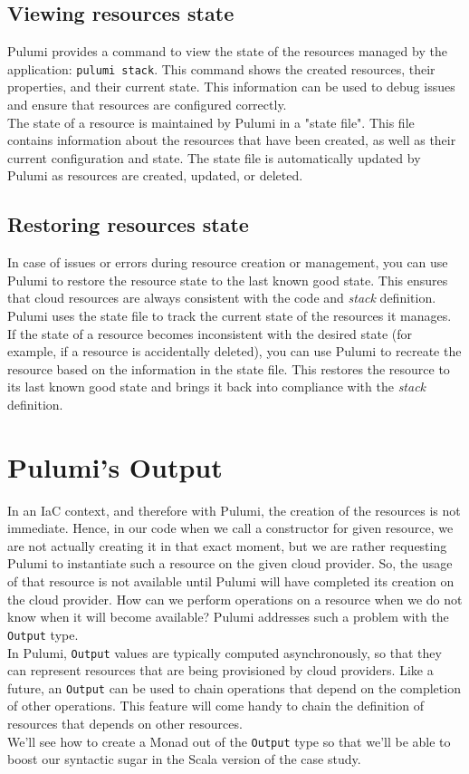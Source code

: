 \subsection{Viewing resources state}
Pulumi provides a command to view the state of the resources managed by the application: \texttt{pulumi stack}.
This command shows the created resources, their properties, and their current state. 
This information can be used to debug issues and ensure that resources are configured correctly.\\
The state of a resource is maintained by Pulumi in a "state file".
This file contains information about the resources that have been created, as well as their current configuration and state.
The state file is automatically updated by Pulumi as resources are created, updated, or deleted.

\subsection{Restoring resources state}
In case of issues or errors during resource creation or management, you can use Pulumi to restore the resource state to the last known good state.
This ensures that cloud resources are always consistent with the code and \textit{stack} definition.\\
Pulumi uses the state file to track the current state of the resources it manages.
If the state of a resource becomes inconsistent with the desired state (for example, if a resource is accidentally deleted), you can use Pulumi to recreate the resource based on the information in the state file.
This restores the resource to its last known good state and brings it back into compliance with the \textit{stack} definition.

\section{Pulumi's Output}
In an IaC context, and therefore with Pulumi, the creation of the resources is not immediate.
Hence, in our code when we call a constructor for given resource, we are not actually creating it in that exact moment, but we are rather requesting Pulumi to instantiate such a resource on the given cloud provider.
So, the usage of that resource is not available until Pulumi will have completed its creation on the cloud provider.
How can we perform operations on a resource when we do not know when it will become available?
Pulumi addresses such a problem with the \texttt{Output} type.\\
In Pulumi, \texttt{Output} values are typically computed asynchronously, so that they can represent resources that are being provisioned by cloud providers.
Like a future, an \texttt{Output} can be used to chain operations that depend on the completion of other operations.
This feature will come handy to chain the definition of resources that depends on other resources.\\
We'll see how to create a Monad out of the \texttt{Output} type so that we'll be able to boost our syntactic sugar in the Scala version of the case study.
